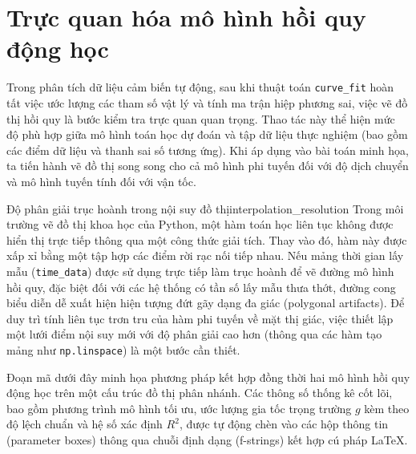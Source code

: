 \section{Trực quan hóa mô hình hồi quy động học}
\label{sec:nonlinear_regression_plot}

Trong phân tích dữ liệu cảm biến tự động, sau khi thuật toán \texttt{curve\_fit} hoàn tất việc ước lượng các tham số vật lý và tính ma trận hiệp phương sai, việc vẽ đồ thị hồi quy là bước kiểm tra trực quan quan trọng. Thao tác này thể hiện mức độ phù hợp giữa mô hình toán học dự đoán và tập dữ liệu thực nghiệm (bao gồm các điểm dữ liệu và thanh sai số tương ứng). Khi áp dụng vào bài toán minh họa, ta tiến hành vẽ đồ thị song song cho cả mô hình phi tuyến đối với độ dịch chuyển và mô hình tuyến tính đối với vận tốc.

\begin{physcore}{Độ phân giải trục hoành trong nội suy đồ thị}{interpolation_resolution}
Trong môi trường vẽ đồ thị khoa học của Python, một hàm toán học liên tục không được hiển thị trực tiếp thông qua một công thức giải tích. Thay vào đó, hàm này được xấp xỉ bằng một tập hợp các điểm rời rạc nối tiếp nhau. Nếu mảng thời gian lấy mẫu (\texttt{time\_data}) được sử dụng trực tiếp làm trục hoành để vẽ đường mô hình hồi quy, đặc biệt đối với các hệ thống có tần số lấy mẫu thưa thớt, đường cong biểu diễn dễ xuất hiện hiện tượng đứt gãy dạng đa giác (polygonal artifacts). Để duy trì tính liên tục trơn tru của hàm phi tuyến về mặt thị giác, việc thiết lập một lưới điểm nội suy mới với độ phân giải cao hơn (thông qua các hàm tạo mảng như \texttt{np.linspace}) là một bước cần thiết.
\end{physcore}

Đoạn mã dưới đây minh họa phương pháp kết hợp đồng thời hai mô hình hồi quy động học trên một cấu trúc đồ thị phân nhánh. Các thông số thống kê cốt lõi, bao gồm phương trình mô hình tối ưu, ước lượng gia tốc trọng trường $g$ kèm theo độ lệch chuẩn và hệ số xác định $R^2$, được tự động chèn vào các hộp thông tin (parameter boxes) thông qua chuỗi định dạng (f-strings) kết hợp cú pháp LaTeX.

